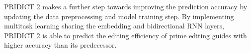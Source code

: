 PRIDICT 2 makes a further step towards improving the prediction accuracy by updating the data preprocessing and model training step. By implementing multitask learning sharing the embedding and bidirectional RNN layers, PRIDICT 2 is able to predict the editing efficiency of prime editing guides with higher accuracy than its predecessor\cite{mathisMachineLearningPrediction2024}. 
